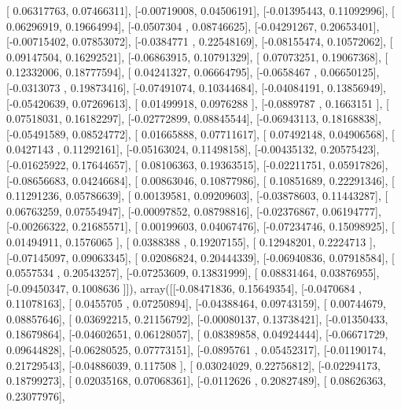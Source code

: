 \documentclass{article}
\begin{document}
       [ 0.06317763,  0.07466311],
       [-0.00719008,  0.04506191],
       [-0.01395443,  0.11092996],
       [ 0.06296919,  0.19664994],
       [-0.0507304 ,  0.08746625],
       [-0.04291267,  0.20653401],
       [-0.00715402,  0.07853072],
       [-0.0384771 ,  0.22548169],
       [-0.08155474,  0.10572062],
       [ 0.09147504,  0.16292521],
       [-0.06863915,  0.10791329],
       [ 0.07073251,  0.19067368],
       [ 0.12332006,  0.18777594],
       [ 0.04241327,  0.06664795],
       [-0.0658467 ,  0.06650125],
       [-0.0313073 ,  0.19873416],
       [-0.07491074,  0.10344684],
       [-0.04084191,  0.13856949],
       [-0.05420639,  0.07269613],
       [ 0.01499918,  0.0976288 ],
       [-0.0889787 ,  0.1663151 ],
       [ 0.07518031,  0.16182297],
       [-0.02772899,  0.08845544],
       [-0.06943113,  0.18168838],
       [-0.05491589,  0.08524772],
       [ 0.01665888,  0.07711617],
       [ 0.07492148,  0.04906568],
       [ 0.0427143 ,  0.11292161],
       [-0.05163024,  0.11498158],
       [-0.00435132,  0.20575423],
       [-0.01625922,  0.17644657],
       [ 0.08106363,  0.19363515],
       [-0.02211751,  0.05917826],
       [-0.08656683,  0.04246684],
       [ 0.00863046,  0.10877986],
       [ 0.10851689,  0.22291346],
       [ 0.11291236,  0.05786639],
       [ 0.00139581,  0.09209603],
       [-0.03878603,  0.11443287],
       [ 0.06763259,  0.07554947],
       [-0.00097852,  0.08798816],
       [-0.02376867,  0.06194777],
       [-0.00266322,  0.21685571],
       [ 0.00199603,  0.04067476],
       [-0.07234746,  0.15098925],
       [ 0.01494911,  0.1576065 ],
       [ 0.0388388 ,  0.19207155],
       [ 0.12948201,  0.2224713 ],
       [-0.07145097,  0.09063345],
       [ 0.02086824,  0.20444339],
       [-0.06940836,  0.07918584],
       [ 0.0557534 ,  0.20543257],
       [-0.07253609,  0.13831999],
       [ 0.08831464,  0.03876955],
       [-0.09450347,  0.1008636 ]]), array([[-0.08471836,  0.15649354],
       [-0.0470684 ,  0.11078163],
       [ 0.0455705 ,  0.07250894],
       [-0.04388464,  0.09743159],
       [ 0.00744679,  0.08857646],
       [ 0.03692215,  0.21156792],
       [-0.00080137,  0.13738421],
       [-0.01350433,  0.18679864],
       [-0.04602651,  0.06128057],
       [ 0.08389858,  0.04924444],
       [-0.06671729,  0.09644828],
       [-0.06280525,  0.07773151],
       [-0.0895761 ,  0.05452317],
       [-0.01190174,  0.21729543],
       [-0.04886039,  0.117508  ],
       [ 0.03024029,  0.22756812],
       [-0.02294173,  0.18799273],
       [ 0.02035168,  0.07068361],
       [-0.0112626 ,  0.20827489],
       [ 0.08626363,  0.23077976],
\end{document}
